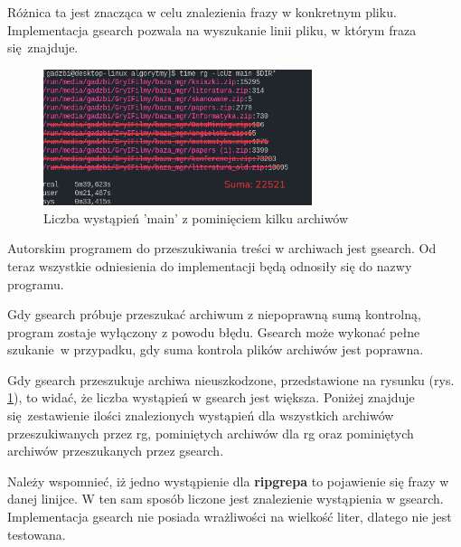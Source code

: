 Różnica ta jest znacząca w celu znalezienia frazy w konkretnym pliku. 
Implementacja gsearch pozwala na wyszukanie linii pliku, w którym fraza się znajduje. 

\begin{figure}[h]
\centering
\includegraphics[width=0.7\textwidth]{./images/rgSkippedmain.png}
\caption{Liczba wystąpień 'main' z pominięciem kilku archiwów}
\label{fig:ripgrepRemoveSkipped}
\end{figure}

Autorskim programem do przeszukiwania treści w archiwach jest gsearch. Od teraz
wszystkie odniesienia do implementacji będą odnosiły się do nazwy programu.

Gdy gsearch próbuje przeszukać archiwum z niepoprawną sumą kontrolną, program
zostaje wyłączony z powodu błędu. Gsearch może wykonać pełne szukanie w przypadku,
gdy suma kontrola plików archiwów jest poprawna.

Gdy gsearch przeszukuje archiwa nieuszkodzone, przedstawione na rysunku (rys. \ref{fig:ripgrepRemoveSkipped}),
to widać, że liczba wystąpień w gsearch jest większa. Poniżej znajduje się zestawienie
ilości znalezionych wystąpień dla wszystkich archiwów przeszukiwanych przez rg,
pominiętych archiwów dla rg oraz pominiętych archiwów przeszukanych przez gsearch.

Należy wspomnieć, iż jedno wystąpienie dla \textbf{ripgrepa} to pojawienie się frazy
w danej linijce. W ten sam sposób liczone jest znalezienie wystąpienia w gsearch.
Implementacja gsearch nie posiada wrażliwości na wielkość liter, dlatego nie 
jest testowana.

